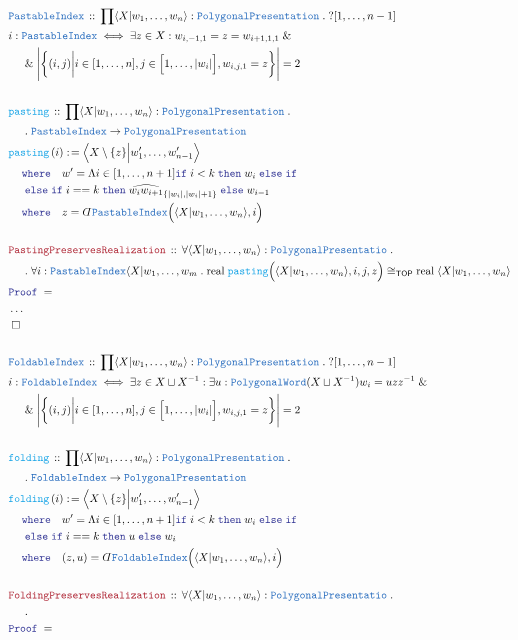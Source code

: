 \documentclass[12pt]{scrartcl}
\newcommand{\TYPE}[1]{\textcolor{NavyBlue}{\mathtt{#1}}}
\newcommand{\FUNC}[1]{\textcolor{Cerulean}{\mathtt{#1}}}
\newcommand{\LOGIC}[1]{\textcolor{Blue}{\mathtt{#1}}}
\newcommand{\THM}[1]{\textcolor{Maroon}{\mathtt{#1}}}
\renewcommand{\.}{\; . \;}
\newcommand{\de}{: \kern 0.1pc =}
\newcommand{\where}{\LOGIC{where}}
\newcommand{\If}{\LOGIC{if} \;}
\newcommand{\Then}{ \; \LOGIC{then} \;}
\newcommand{\Else}{\; \LOGIC{else} \;}
\newcommand{\Act}[1]{\left( #1 \right)}
\newcommand{\Theorem}[2]{& \THM{#1} \, :: \, #2 \\ & \Proof = \\ }
\newcommand{\DeclareType}[2]{& \TYPE{#1} \, :: \, #2 \\}
\newcommand{\DefineType}[3]{& #1 : \TYPE{#2} \iff #3 \\}
\newcommand{\DeclareFunc}[2]{& \FUNC{#1} \, :: \, #2 \\}
\newcommand{\DefineFunc}[3]{&  \FUNC{#1}\Act{#2} \de #3 \\}
\newcommand{\NewLine}{\\ & \kern 1pc}
\newcommand{\Page}[1]{ \begin{align*} #1 \end{align*}   }
\newcommand{ \bd }{ \ByDef }
\newcommand{\NoProof}{ & \ldots \\ \EndProof}
\renewcommand{\And}{\; \& \;}
\newcommand{\QED}{\; \square}
\newcommand{\EndProof}{& \QED \\}
\newcommand{\ByDef}{\rotatebox[origin=c]{-180}{$D$}}%
\newcommand{\Proof}{\LOGIC{Proof} \; }
\newcommand{\TOP}{\mathsf{TOP}}
\begin{document}
\Page{
	\DeclareType{PastableIndex}
	{
		\prod \langle X | w_1, \ldots, w_n \rangle : \TYPE{PolygonalPresentation} \.
		?[1,\ldots,n-1]
	}
	\DefineType{i}{PastableIndex}
	{
		\exists z \in X :  
		w_{i,-1,1} = z = w_{i+1,1,1} \And \NewLine \And
		\Bigg|\bigg\{  (i,j)  \bigg| i \in [1,\ldots,n], j \in \Big[1,\ldots,|w_i|\Big], w_{i,j,1} = z  \bigg\} \Bigg| = 2
	}
	\\
	\DeclareFunc{pasting}{
		\prod \langle X | w_1,\ldots,w_n \rangle : \TYPE{PolygonalPresentation} \. \NewLine \. 
		\TYPE{PastableIndex} \to \TYPE{PolygonalPresentation}
	}
	\DefineFunc{pasting}{ i }
	{
		\Big\langle X \setminus \{z\} \Big| w'_1, \ldots, w'_{n-1}  \Big\rangle
		\NewLine
		\where \quad
		w' = \Lambda i \in [1,\ldots,n+1] \If i < k \Then w_i 
		\Else \If \NewLine \Else \If i == k \Then  \widehat{w_i w_{i+1}}_{\{|w_i|,|w_i|+1\}}
		\Else w_{i-1}
		\NewLine
		\where
		\quad
		z = \bd \TYPE{PastableIndex}\Big( \langle X | w_1,\ldots, w_n \rangle, i \Big)
	}
	\\
	\Theorem{PastingPreservesRealization}
	{
		\forall \langle X | w_1,\ldots,w_n \rangle : \TYPE{PolygonalPresentatio} \. \NewLine \. 
		\forall i : \TYPE{PastableIndex}\langle X |w_1,\ldots,w_m \.
		\mathrm{real}\;\FUNC{pasting}\Big( \langle X | w_1,\ldots, w_n \rangle, i,j,z\Big) \cong_\TOP
		\mathrm{real} \;  \langle X | w_1, \ldots,w_n \rangle
	}
	\NoProof
	\\
	\DeclareType{FoldableIndex}
	{
		\prod \langle X | w_1, \ldots, w_n \rangle : \TYPE{PolygonalPresentation} \.
		?[1,\ldots,n-1]
	}
	\DefineType{i}{FoldableIndex}
	{
		\exists z \in X \sqcup X^{-1}  :
		\exists u : \TYPE{PolygonalWord}(X \sqcup X^{-1}) 
		w_{i} = uzz^{-1} \And \NewLine \And
		\Bigg|\bigg\{  (i,j)  \bigg| i \in [1,\ldots,n], j \in \Big[1,\ldots,|w_i|\Big], w_{i,j,1} = z  \bigg\} \Bigg| = 2
	}
	\\
	\DeclareFunc{folding}{
		\prod \langle X | w_1,\ldots,w_n \rangle : \TYPE{PolygonalPresentation} \. \NewLine \. 
		\TYPE{FoldableIndex} \to \TYPE{PolygonalPresentation}
	}
	\DefineFunc{folding}{ i }
	{
		\Big\langle X \setminus \{z\} \Big| w'_1, \ldots, w'_{n-1}  \Big\rangle
		\NewLine
		\where \quad
		w' = \Lambda i \in [1,\ldots,n+1] \If i < k \Then w_i 
		\Else \If \NewLine \Else \If i == k \Then  u
		\Else w_{i}
		\NewLine
		\where
		\quad
		(z,u) = \bd \TYPE{FoldableIndex}\Big( \langle X | w_1,\ldots, w_n \rangle, i \Big)
	}
	\\
	\Theorem{FoldingPreservesRealization}
	{
		\forall \langle X | w_1,\ldots,w_n \rangle : \TYPE{PolygonalPresentatio} \. \NewLine \. 
}}
\end{document}
